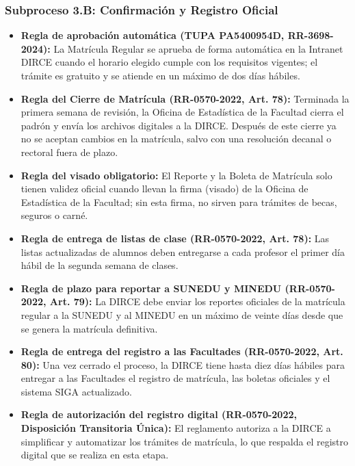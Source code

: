 \subsubsection{Subproceso 3.B: Confirmación y Registro Oficial}

\begin{itemize}
    \item \textbf{Regla de aprobación automática (TUPA PA5400954D, RR-3698-2024):} La Matrícula Regular se aprueba de forma automática en la Intranet DIRCE cuando el horario elegido cumple con los requisitos vigentes; el trámite es gratuito y se atiende en un máximo de dos días hábiles.

    \item \textbf{Regla del Cierre de Matrícula (RR-0570-2022, Art. 78\textdegree{}):} Terminada la primera semana de revisión, la Oficina de Estadística de la Facultad cierra el padrón y envía los archivos digitales a la DIRCE. Después de este cierre ya no se aceptan cambios en la matrícula, salvo con una resolución decanal o rectoral fuera de plazo.

    \item \textbf{Regla del visado obligatorio:} El Reporte y la Boleta de Matrícula solo tienen validez oficial cuando llevan la firma (visado) de la Oficina de Estadística de la Facultad; sin esta firma, no sirven para trámites de becas, seguros o carné.

    \item \textbf{Regla de entrega de listas de clase (RR-0570-2022, Art. 78\textdegree{}):} Las listas actualizadas de alumnos deben entregarse a cada profesor el primer día hábil de la segunda semana de clases.

    \item \textbf{Regla de plazo para reportar a SUNEDU y MINEDU (RR-0570-2022, Art. 79\textdegree{}):} La DIRCE debe enviar los reportes oficiales de la matrícula regular a la SUNEDU y al MINEDU en un máximo de veinte días desde que se genera la matrícula definitiva.

    \item \textbf{Regla de entrega del registro a las Facultades (RR-0570-2022, Art. 80\textdegree{}):} Una vez cerrado el proceso, la DIRCE tiene hasta diez días hábiles para entregar a las Facultades el registro de matrícula, las boletas oficiales y el sistema SIGA actualizado.

    \item \textbf{Regla de autorización del registro digital (RR-0570-2022, Disposición Transitoria Única):} El reglamento autoriza a la DIRCE a simplificar y automatizar los trámites de matrícula, lo que respalda el registro digital que se realiza en esta etapa.
\end{itemize}
